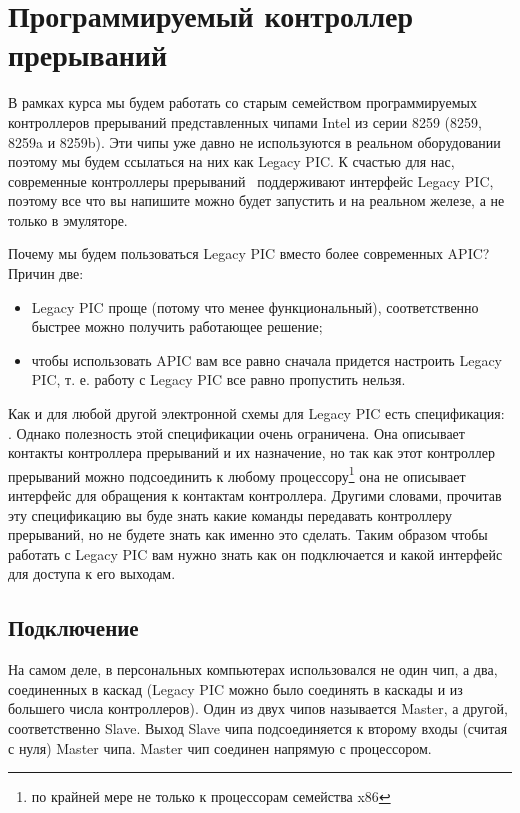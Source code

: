 \section{Программируемый контроллер прерываний}

В рамках курса мы будем работать со старым семейством программируемых контроллеров
прерываний представленных чипами Intel из серии 8259 (8259, 8259a и 8259b). Эти
чипы уже давно не используются в реальном оборудовании поэтому мы будем
ссылаться на них как Legacy PIC. К счастью для нас, современные контроллеры
прерываний~\cite{WIKI:APIC} поддерживают интерфейс Legacy PIC, поэтому все что
вы напишите можно будет запустить и на реальном железе, а не только в эмуляторе.

Почему мы будем пользоваться Legacy PIC вместо более современных APIC? Причин
две:
\begin{itemize}
  \item Legacy PIC проще (потому что менее функциональный), соответственно
        быстрее можно получить работающее решение;
  \item чтобы использовать APIC вам все равно сначала придется настроить
        Legacy PIC, т. е. работу с Legacy PIC все равно пропустить нельзя.
\end{itemize}

Как и для любой другой электронной схемы для Legacy PIC есть спецификация:
\cite{INTEL:8259ADS}. Однако полезность этой спецификации очень ограничена. Она
описывает контакты контроллера прерываний и их назначение, но так как этот
контроллер прерываний можно подсоединить к любому процессору\footnote{по крайней
мере не только к процессорам семейства x86} она не описывает интерфейс для
обращения к контактам контроллера. Другими словами, прочитав эту спецификацию
вы буде знать какие команды передавать контроллеру прерываний, но не будете
знать как именно это сделать. Таким образом чтобы работать с Legacy PIC вам
нужно знать как он подключается и какой интерфейс для доступа к его выходам.

\subsection{Подключение}

На самом деле, в персональных компьютерах использовался не один чип, а два,
соединенных в каскад (Legacy PIC можно было соединять в каскады и из большего
числа контроллеров). Один из двух чипов называется Master, а другой,
соответственно Slave. Выход Slave чипа подсоединяется к второму входы (считая с
нуля) Master чипа. Master чип соединен напрямую с процессором.

